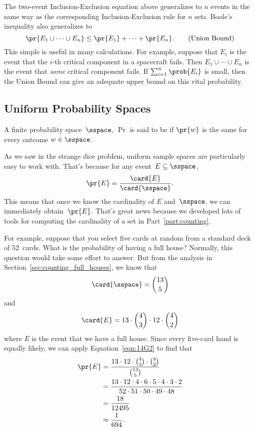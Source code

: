 The two-event Inclusion-Exclusion equation above generalizes to $n$ events
in the same way as the corresponding Inclusion-Exclusion rule for $n$
sets.  Boole's inequality also generalizes to
\begin{equation}
    \pr{E_1 \cup \cdots \cup E_n} \leq \pr{E_1} + \cdots + \pr{E_n}.\tag{Union Bound}
\end{equation}
This simple  is useful in many calculations.  For
example, suppose that $E_i$ is the event that the $i$-th critical
component in a spacecraft fails.  Then $E_1 \cup \cdots \cup E_n$ is
the event that \emph{some} critical component fails.  If $\sum_{i =
  1}^n \prob{E_i}$ is small, then the Union Bound can give an adequate
upper bound on this vital probability.

\subsection{Uniform Probability Spaces}

\begin{definition}\label{def:uniform_pspace}
A finite probability space~$\sspace$, $\Pr$ is said to be
 if $\pr{w}$ is the same for every outcome $w
\in \sspace$.
\end{definition}

As we saw in the strange dice problem, uniform sample spaces are
particularly easy to work with.  That's because for any event~$E
\subseteq \sspace$,
\begin{equation}\label{eqn:14G2}
    \pr{E} = \frac{\card{E}}{\card{\sspace}}.
\end{equation}
This means that once we know the cardinality of $E$ and~$\sspace$, we
can immediately obtain~$\pr{E}$.  That's great news because we
developed lots of tools for computing the cardinality of a set in
Part~\ref{part:counting}.

For example, suppose that you select five cards at random from a
standard deck of 52~cards.  What is the probability of having a full
house?  Normally, this question would take some effort to answer.  But
from the analysis in Section~\ref{sec:counting_full_houses}, we know
that
\begin{equation*}
    \card{\sspace} = \binom{13}{5}
\end{equation*}
and
\begin{equation*}
    \card{E} = 13 \cdot \binom{4}{3} \cdot 12 \cdot \binom{4}{2}
\end{equation*}
where $E$ is the event that we have a full house.  Since every
five-card hand is equally likely, we can apply Equation~\ref{eqn:14G2}
to find that
\begin{align*}
\pr{E}  &= \frac{13 \cdot 12 \cdot \binom{4}{3} \cdot \binom{4}{2}}
                {\binom{13}{5}} \\
        &= \frac{13 \cdot 12 \cdot 4 \cdot 6 \cdot 5 \cdot 4 \cdot 3 \cdot 2}
                {52 \cdot 51 \cdot 50 \cdot 49 \cdot 48} \\
        &= \frac{18}{12495} \\
        &\approx \frac{1}{694}.
\end{align*}

